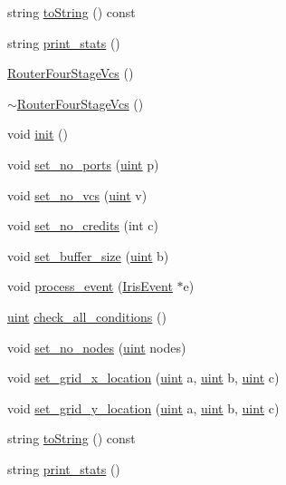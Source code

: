 \begin{CompactItemize}
\item 
string \hyperlink{classRouterFourStageVcs_0f2d0c3bcd780832ec371374eb3950fd}{toString} () const 
\item 
string \hyperlink{classRouterFourStageVcs_22248991584f945954ef5f520b786c15}{print\_\-stats} ()
\item 
\hyperlink{classRouterFourStageVcs_4ab2afa09beddb03b1c2e1a9658c4ffd}{RouterFourStageVcs} ()
\item 
\hyperlink{classRouterFourStageVcs_d81c40fe3a0d48cf9e6475b3ad9b3f33}{$\sim$RouterFourStageVcs} ()
\item 
void \hyperlink{classRouterFourStageVcs_203c41c81023398f78d90731b6fa3299}{init} ()
\item 
void \hyperlink{classRouterFourStageVcs_a8b764ec1d80fabdd6c9573f6e860149}{set\_\-no\_\-ports} (\hyperlink{outputBuffer_8h_91ad9478d81a7aaf2593e8d9c3d06a14}{uint} p)
\item 
void \hyperlink{classRouterFourStageVcs_e68dab8bc043b0922c5a02fa64ccbf14}{set\_\-no\_\-vcs} (\hyperlink{outputBuffer_8h_91ad9478d81a7aaf2593e8d9c3d06a14}{uint} v)
\item 
void \hyperlink{classRouterFourStageVcs_87998d0b2fb2c60ffdc21e20000696b0}{set\_\-no\_\-credits} (int c)
\item 
void \hyperlink{classRouterFourStageVcs_94759bddc4770f0ce40545682606847a}{set\_\-buffer\_\-size} (\hyperlink{outputBuffer_8h_91ad9478d81a7aaf2593e8d9c3d06a14}{uint} b)
\item 
void \hyperlink{classRouterFourStageVcs_81562fa747c216e200476ab1f85699bf}{process\_\-event} (\hyperlink{classIrisEvent}{IrisEvent} $\ast$e)
\item 
\hyperlink{outputBuffer_8h_91ad9478d81a7aaf2593e8d9c3d06a14}{uint} \hyperlink{classRouterFourStageVcs_74ebbb630955fad918eef15c2bc39bcf}{check\_\-all\_\-conditions} ()
\item 
void \hyperlink{classRouterFourStageVcs_991fb1adc65124da8dc100855835a193}{set\_\-no\_\-nodes} (\hyperlink{outputBuffer_8h_91ad9478d81a7aaf2593e8d9c3d06a14}{uint} nodes)
\item 
void \hyperlink{classRouterFourStageVcs_c11828571c463389fd410cd4e80768fb}{set\_\-grid\_\-x\_\-location} (\hyperlink{outputBuffer_8h_91ad9478d81a7aaf2593e8d9c3d06a14}{uint} a, \hyperlink{outputBuffer_8h_91ad9478d81a7aaf2593e8d9c3d06a14}{uint} b, \hyperlink{outputBuffer_8h_91ad9478d81a7aaf2593e8d9c3d06a14}{uint} c)
\item 
void \hyperlink{classRouterFourStageVcs_dc137468a451d509ee2e24b2b1380930}{set\_\-grid\_\-y\_\-location} (\hyperlink{outputBuffer_8h_91ad9478d81a7aaf2593e8d9c3d06a14}{uint} a, \hyperlink{outputBuffer_8h_91ad9478d81a7aaf2593e8d9c3d06a14}{uint} b, \hyperlink{outputBuffer_8h_91ad9478d81a7aaf2593e8d9c3d06a14}{uint} c)
\item 
string \hyperlink{classRouterFourStageVcs_0f2d0c3bcd780832ec371374eb3950fd}{toString} () const 
\item 
string \hyperlink{classRouterFourStageVcs_22248991584f945954ef5f520b786c15}{print\_\-stats} ()
\end{CompactItemize}
